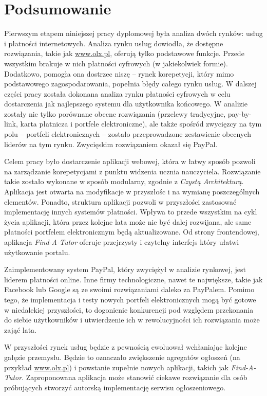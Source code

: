 \documentclass[12pt]{article}
\numberwithin{figure}{section}
\begin{document}
\begin{sloppypar}
\section{Podsumowanie}
Pierwszym etapem niniejszej pracy dyplomowej była analiza dwóch rynków: usług i płatności internetowych. Analiza rynku usług dowiodła, że dostępne rozwiązania, takie jak \url{www.olx.pl}, oferują tylko podstawowe funkcje. Przede wszystkim brakuje w nich płatności cyfrowych (w jakiekolwiek formie). Dodatkowo, pomogła ona dostrzec niszę -- rynek korepetycji, który mimo podstawowego zagospodarowania, popełnia błędy całego rynku usług. W dalszej części pracy została dokonana analiza rynku płatności cyfrowych w celu dostarczenia jak najlepszego systemu dla użytkownika końcowego. W analizie zostały nie tylko porównane obecne rozwiązania (przelewy tradycyjne, pay-by-link, karta płatnicza i portfele elektroniczne), ale także spośród zwycięzcy na tym polu -- portfeli elektronicznych -- zostało przeprowadzone zestawienie obecnych liderów na tym rynku. Zwycięskim rozwiązaniem okazał się PayPal. 

Celem pracy było dostarczenie aplikacji webowej, która w łatwy sposób pozwoli na zarządzanie korepetycjami z punktu widzenia ucznia nauczyciela. Rozwiązanie takie zostało wykonane w sposób modularny, zgodnie z \textit{Czystą Architekturą}. Aplikacja jest otwarta na modyfikacje w przyszłośc i na wymianę poszczególnych elementów. Ponadto, struktura aplikacji pozwoli w przyszłości zastosować implementację innych systemów płatności. Wpływa to przede wszystkim na cykl życia aplikacji, która przez kolejne lata może nie być dalej rozwijana, ale same płatności portfelem elektronicznym będą aktualizowane. Od strony frontendowej, aplikacja \textit{Find-A-Tutor} oferuje przejrzysty i czytelny interfejs który ułatwi użytkowanie portalu. 

Zaimplementowany system PayPal, który zwyciężył w analizie rynkowej, jest liderem płatności online. Inne firmy technologiczne, nawet te największe, takie jak Facebook lub Google są ze swoimi rozwiązaniami daleko za PayPalem. Pomimo tego, że implementacja i testy nowych portfeli elektronicznych mogą być gotowe w niedalekiej przyszłości, to dogonienie konkurencji pod względem przekonania do siebie użytkowników i utwierdzenie ich w rewolucyjności ich rozwiązania może zająć lata.

W przyszłości rynek usług będzie z pewnością ewoluował wchłaniając kolejne gałęzie przemysłu. Będzie to oznaczało zwiększenie agregatów ogłoszeń (na przykład \url{www.olx.pl}) i powstanie zupełnie nowych aplikacji, takich jak \textit{Find-A-Tutor}. Zaproponowana aplikacja może stanowić ciekawe rozwiązanie dla osób próbujących stworzyć autorską implementację serwisu ogłoszeniowego.


\end{sloppypar}
\end{document}
